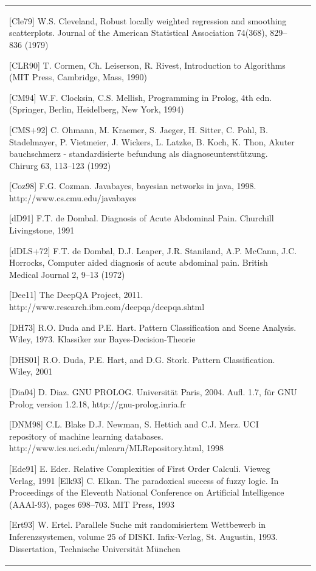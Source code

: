 \documentclass[10pt]{book}
\begin{document}
\begin{tabular}{|l|l|}
[Cle79] W.S. Cleveland, Robust locally weighted regression and smoothing scatterplots. Journal of the American Statistical Association 74(368), 829–836 (1979)

[CLR90] T. Cormen, Ch. Leiserson, R. Rivest, Introduction to Algorithms (MIT Press, Cambridge, Mass, 1990)

[CM94] W.F. Clocksin, C.S. Mellish, Programming in Prolog, 4th edn. (Springer, Berlin, Heidelberg, New York, 1994)

[CMS+92] C. Ohmann, M. Kraemer, S. Jaeger, H. Sitter, C. Pohl, B. Stadelmayer, P. Vietmeier, J. Wickers, L. Latzke, B. Koch, K. Thon, Akuter bauchschmerz - standardisierte befundung als diagnoseunterstützung. Chirurg 63, 113–123 (1992)

[Coz98] F.G. Cozman. Javabayes, bayesian networks in java, 1998. http://www.cs.cmu.edu/javabayes

[dD91] F.T. de Dombal. Diagnosis of Acute Abdominal Pain. Churchill Livingstone, 1991

[dDLS+72] F.T. de Dombal, D.J. Leaper, J.R. Staniland, A.P. McCann, J.C. Horrocks, Computer aided diagnosis of acute abdominal pain. British Medical Journal 2, 9–13 (1972)

[Dee11] The DeepQA Project, 2011. http://www.research.ibm.com/deepqa/deepqa.shtml

[DH73] R.O. Duda and P.E. Hart. Pattern Classification and Scene Analysis. Wiley, 1973. Klassiker zur Bayes-Decision-Theorie

[DHS01] R.O. Duda, P.E. Hart, and D.G. Stork. Pattern Classification. Wiley, 2001

[Dia04] D. Diaz. GNU PROLOG. Universität Paris, 2004. Aufl. 1.7, für GNU Prolog version 1.2.18, http://gnu-prolog.inria.fr

[DNM98] C.L. Blake D.J. Newman, S. Hettich and C.J. Merz. UCI repository of machine learning databases. http://www.ics.uci.edu/mlearn/MLRepository.html, 1998

[Ede91] E. Eder. Relative Complexities of First Order Calculi. Vieweg Verlag, 1991
[Elk93] C. Elkan. The paradoxical success of fuzzy logic. In Proceedings of the Eleventh National Conference on Artificial Intelligence (AAAI-93), pages 698--703. MIT Press, 1993

[Ert93] W. Ertel. Parallele Suche mit randomisiertem Wettbewerb in Inferenzsystemen, volume 25 of DISKI. Infix-Verlag, St. Augustin, 1993. Dissertation, Technische Universit\"at M\"unchen


\end{tabular}
\end{document}
